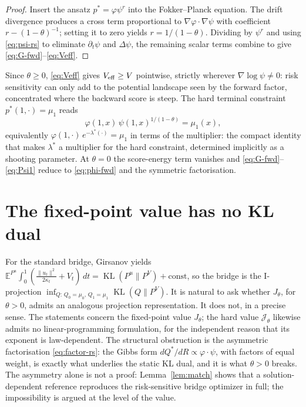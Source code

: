 \documentclass[letterpaper,10pt,conference]{IEEEtran}
\newcommand{\KL}{\operatorname{KL}}
\newcommand{\EE}{\mathbb{E}}
\newcommand{\cJ}{\mathcal{J}}
\begin{document}
	\begin{proof}
		Insert the ansatz $p^*=\varphi\psi^r$ into the Fokker--Planck equation. The
		drift divergence produces a cross term proportional to
		$\nabla\varphi\cdot\nabla\psi$ with coefficient $r-(1-\theta)^{-1}$; setting
		it to zero yields $r=1/(1-\theta)$. Dividing by $\psi^r$ and using
		\eqref{eq:psi-rs} to eliminate $\partial_t\psi$ and $\Delta\psi$, the
		remaining scalar terms combine to give \eqref{eq:G-fwd}--\eqref{eq:Veff}.
	\end{proof}
	
	Since $\theta\ge0$, \eqref{eq:Veff} gives $V_{\rm eff}\ge V$ pointwise,
	strictly wherever $\nabla\log\psi\neq0$: risk sensitivity can only add to the
	potential landscape seen by the forward factor, concentrated where the
	backward score is steep. The hard terminal constraint $p^*(1,\cdot)=\mu_1$
	reads
	\begin{equation}
		\label{eq:Psi1}
		\varphi(1,x)\,\psi(1,x)^{1/(1-\theta)}=\mu_1(x),
	\end{equation}
	equivalently $\varphi(1,\cdot)\,e^{-\lambda^*(\cdot)}=\mu_1$ in terms of the
	multiplier: the compact identity that makes $\lambda^*$ a multiplier for the hard
	constraint, determined implicitly as a shooting parameter. At $\theta=0$ the
	score-energy term vanishes and \eqref{eq:G-fwd}--\eqref{eq:Psi1} reduce to
	\eqref{eq:phi-fwd} and the symmetric factorisation.
	
	\section{The fixed-point value has no KL dual}
	\label{sec:no-kl}
	
	For the standard bridge, Girsanov yields
	$\EE^{P^u}\!\int_0^1(\frac{\|u_t\|^2}{2\kappa_t}+V_t)\,dt
	=\KL(P^u\|P^V)+\text{const}$, so the bridge is the I-projection
	$\inf_{Q:\,Q_0=\mu_0,\,Q_1=\mu_1}\KL(Q\|P^V)$. It is natural to ask whether
	$J_\theta$, for $\theta>0$, admits an analogous projection representation. It
	does not, in a precise sense. The statements concern the fixed-point value
	$J_\theta$; the hard value $\cJ_\theta$ likewise admits no linear-programming
	formulation, for the independent reason that its exponent is law-dependent. The structural obstruction is the asymmetric
	factorisation \eqref{eq:factor-rs}: the Gibbs form
	$dQ^*/dR\propto\varphi\cdot\psi$, with factors of equal weight, is exactly
	what underlies the static KL dual, and it is what $\theta>0$ breaks. The asymmetry alone is not a proof: Lemma~\ref{lem:match} shows that a
	solution-dependent reference reproduces the risk-sensitive bridge optimizer in
	full; the
	impossibility is argued at the level of the value.
	
\end{document}
